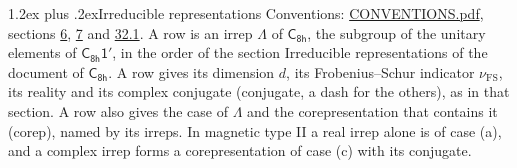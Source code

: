 \documentclass[10pt,a4paper]{article}
\makeatletter
\renewcommand\section{\@startsection{section}{1}{\z@}{-3ex plus -1ex minus -.2ex}%
  {1.2ex plus .2ex}{\normalfont\large\sffamily\bfseries\color{parttitle}}}
\numberwithin{equation}{section}
\newcommand{\grp}[1]{\mathsf{#1}}
\newcommand{\fsind}{\nu_{\mathrm{FS}}}
\makeatother
\begin{document}
\section{Irreducible representations}\label{s:irreps}
Conventions: \href{../../CONVENTIONS.pdf}{CONVENTIONS.pdf}, sections \href{../../../rotation/CONVENTIONS.pdf\#conv.6}{6}, \href{../../../rotation/CONVENTIONS.pdf\#conv.7}{7} and \href{../../CONVENTIONS.pdf\#conv.32.1}{32.1}.
\leavevmode\label{n:irrep.Delta}A row is an irrep $\Lambda$ of $\grp{C_{8h}}$, the subgroup of the unitary elements of $\grp{C_{8h}1'}$, in the order of the section Irreducible representations of the document of \href{../../../rotation/data/pdf/C8h.pdf}{$\grp{C_{8h}}$}. \label{n:index.dimension}\label{n:index.frobenius}\label{n:head.irrep}\label{n:head.reality}\label{n:head.conjugate}A row gives its dimension $d$, its Frobenius--Schur indicator $\fsind$, its reality and its complex conjugate (conjugate, a dash for the others), as in that section. \label{n:head.case.corep}\label{n:head.corep}A row also gives the case of $\Lambda$ and the corepresentation that contains it (corep), named by its irreps. In magnetic type II a real irrep alone is of case (a), and a complex irrep forms a corepresentation of case (c) with its conjugate.
\setlength{\emergencystretch}{2em}\par\setlength{\emergencystretch}{0pt}
\end{document}
